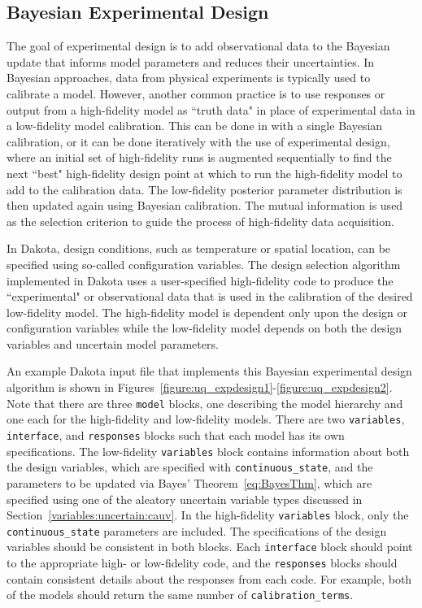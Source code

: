 \subsection{Bayesian Experimental Design}
\label{sec:bayes_expdesign}

The goal of experimental design is to add observational data to the Bayesian
update that informs model parameters and reduces their uncertainties. In 
Bayesian approaches, data from physical experiments is typically used to 
calibrate a model. However, another common practice is to use responses or
output from a high-fidelity model as ``truth data" in place of experimental 
data in a low-fidelity model calibration. This can be done in with a single
Bayesian calibration, or it can be done iteratively with the use of 
experimental design, where an initial set of high-fidelity runs is 
augmented sequentially to find the next ``best" high-fidelity design point at
which to run the high-fidelity model to add to the calibration data. The 
low-fidelity posterior parameter distribution is then updated again using 
Bayesian calibration. The mutual information is used as the selection criterion 
to guide the process of high-fidelity data acquisition.

In Dakota, design conditions, such as temperature or spatial location, can be 
specified using so-called configuration
variables. The design selection algorithm implemented in Dakota uses a 
user-specified high-fidelity code to produce the ``experimental" or 
observational data that is used in the calibration of the desired low-fidelity 
model. The high-fidelity model is dependent only upon the design or 
configuration variables while the low-fidelity model depends on both the 
design variables and uncertain model parameters. 

An example Dakota input file that implements this Bayesian experimental design 
algorithm is shown in 
Figures~\ref{figure:uq_expdesign1}-\ref{figure:uq_expdesign2}. Note that there 
are three \texttt{model} blocks, one describing the model hierarchy and one 
each for the high-fidelity and low-fidelity models. There are two 
\texttt{variables}, \texttt{interface}, and \texttt{responses} blocks such that 
each model has its own specifications. The low-fidelity \texttt{variables} 
block contains information about both the design variables, which are specified 
with \texttt{continuous\_state}, and the parameters to be updated via Bayes' 
Theorem~\ref{eq:BayesThm}, which are specified using one of the aleatory 
uncertain variable types discussed in Section~\ref{variables:uncertain:cauv}. 
In the high-fidelity \texttt{variables} block, only the 
\texttt{continuous\_state} parameters are included. The specifications of the 
design variables should be consistent in both blocks. Each \texttt{interface} 
block should point to the appropriate high- or low-fidelity code, and the 
\texttt{responses} blocks should contain consistent details about the responses 
from each code. For example, both of the models should return the same number 
of \texttt{calibration\_terms}.  

